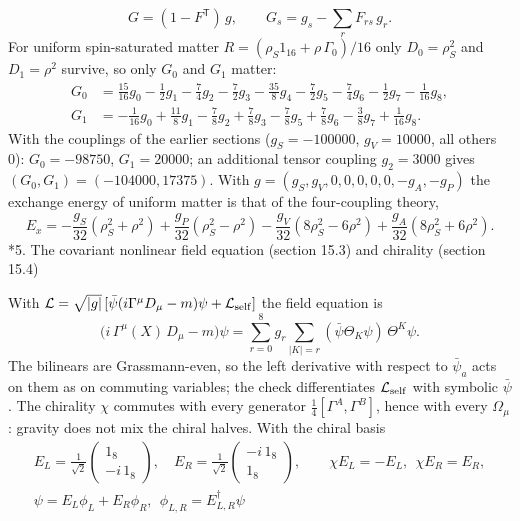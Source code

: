 \documentclass[10pt,a4paper]{article}
\makeatletter
\renewcommand\section{\@startsection{section}{1}{\z@}{-3.5ex \@plus -1ex \@minus -.2ex}{2.3ex \@plus.2ex}{\normalfont\Large\bfseries\raggedright}}
\makeatother
\begin{document}
\begin{equation*}
G=(1-F^{\mathsf T})\,g,\qquad G_s=g_s-\sum_rF_{rs}\,g_r .
\end{equation*}
For uniform spin-saturated matter $R=(\rho_S1_{16}+\rho\,\Gamma_0)/16$ only $D_0=\rho_S^2$ and $D_1=\rho^2$ survive, so only $G_0$ and $G_1$ matter:
\begin{align*}
G_0&=\tfrac{15}{16}g_0-\tfrac{1}{2}g_1-\tfrac{7}{4}g_2-\tfrac{7}{2}g_3-\tfrac{35}{8}g_4-\tfrac{7}{2}g_5-\tfrac{7}{4}g_6-\tfrac{1}{2}g_7-\tfrac{1}{16}g_8, \\
G_1&=-\tfrac{1}{16}g_0+\tfrac{11}{8}g_1-\tfrac{7}{8}g_2+\tfrac{7}{8}g_3-\tfrac{7}{8}g_5+\tfrac{7}{8}g_6-\tfrac{3}{8}g_7+\tfrac{1}{16}g_8 .
\end{align*}
With the couplings of the earlier sections ($g_S=-100000$, $g_V=10000$, all others 0): $G_0=-98750$, $G_1=20000$; an additional tensor coupling $g_2=3000$ gives $(G_0,G_1)=(-104000,17375)$. With $g=(g_S,g_V,0,0,0,0,0,-g_A,-g_P)$ the exchange energy of uniform matter is that of the four-coupling theory,
\begin{equation*}
E_x=-\frac{g_S}{32}(\rho_S^2+\rho^2)+\frac{g_P}{32}(\rho_S^2-\rho^2)-\frac{g_V}{32}(8\rho_S^2-6\rho^2)+\frac{g_A}{32}(8\rho_S^2+6\rho^2).
\end{equation*}
\section*{5. The covariant nonlinear field equation (section 15.3) and chirality (section 15.4)}
With $\mathcal L=\sqrt{|g|}\,[\bar\psi(i\Gamma^\mu D_\mu-m)\psi+\mathcal L_{\rm self}]$ the field equation is
\begin{equation*}
\big(i\,\Gamma^\mu(X)\,D_\mu-m\big)\psi=\sum_{r=0}^{8}g_r\sum_{|K|=r}(\bar\psi\Theta_K\psi)\,\Theta^K\psi .
\end{equation*}
The bilinears are Grassmann-even, so the left derivative with respect to $\bar\psi_a$ acts on them as on commuting variables; the check differentiates $\mathcal L_{\rm self}$ with symbolic $\bar\psi$. The chirality $\chi$ commutes with every generator $\frac14[\Gamma^A,\Gamma^B]$, hence with every $\Omega_\mu$: gravity does not mix the chiral halves. With the chiral basis
\begin{gather*}
E_L=\frac1{\sqrt2}\begin{pmatrix}1_8\\-i\,1_8\end{pmatrix},\quad E_R=\frac1{\sqrt2}\begin{pmatrix}-i\,1_8\\1_8\end{pmatrix},\qquad \chi E_L=-E_L,\ \ \chi E_R=E_R,\\ \psi=E_L\phi_L+E_R\phi_R,\ \ \phi_{L,R}=E_{L,R}^\dagger\psi
\end{gather*}
\end{document}
